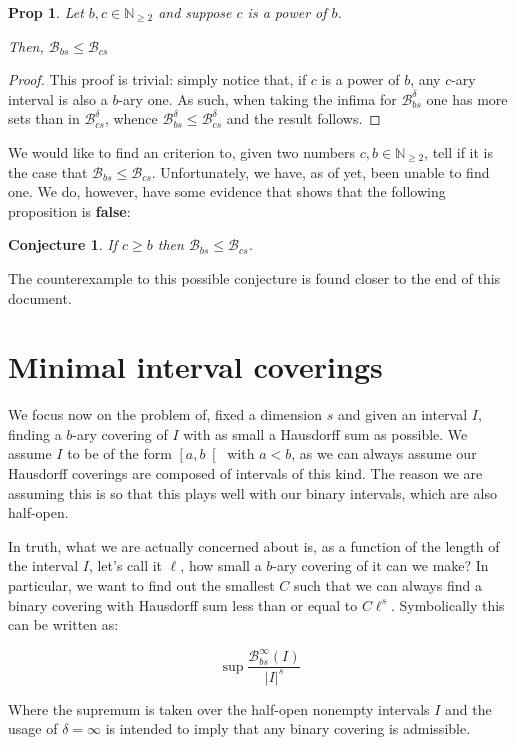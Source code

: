 \documentclass[11pt, reqno]{amsart}
\newcommand{\N}{\mathbb{N}}
\newcommand{\BB}{\mathcal{B}}
\newtheorem{prop}{Prop}
\newtheorem{conjecture}{Conjecture}
\begin{document}
\begin{prop}
Let $b, c \in \N_{\geq 2}$ and suppose $c$ is a power of $b$.

Then, $\BB_{bs} \leq \BB_{cs}$
\end{prop}

\begin{proof}
This proof is trivial: simply notice that, if $c$ is a power of $b$, any $c$-ary interval is also a $b$-ary one. As such, when taking the infima for $\BB_{bs}^\delta$ one has more sets than in $\BB_{cs}^\delta$, whence $\BB_{bs}^\delta \leq \BB_{cs}^\delta$ and the result follows.
\end{proof}

We would like to find an criterion to, given two numbers $c, b \in \N_{\geq 2}$, tell if it is the case that $\BB_{bs} \leq \BB_{cs}$. Unfortunately, we have, as of yet, been unable to find one. We do, however, have some evidence that shows that the following proposition is \textbf{false}: 

\begin{conjecture}
If $c \geq b$ then $\BB_{bs} \leq \BB_{cs}$.
\end{conjecture}

The counterexample to this possible conjecture is found closer to the end of this document.

\section{Minimal interval coverings}\label{sec5}

We focus now on the problem of, fixed a dimension $s$ and given an interval $I$, finding a $b$-ary covering of $I$ with as small a Hausdorff sum as possible. We assume $I$ to be of the form $\left[ a, b \right[$ with $a < b$, as we can always assume our Hausdorff coverings are composed of intervals of this kind. The reason we are assuming this is so that this plays well with our binary intervals, which are also half-open.

In truth, what we are actually concerned about is, as a function of the length of the interval $I$, let's call it $\ell$, how small a $b$-ary covering of it can we make? In particular, we want to find out the smallest $C$ such that we can always find a binary covering with Hausdorff sum less than or equal to $C \ell^s$. Symbolically this can be written as:

\[\sup \frac{\BB_{bs}^\infty(I)}{\lvert I \rvert^s}\]

Where the supremum is taken over the half-open nonempty intervals $I$ and the usage of $\delta = \infty$ is intended to imply that any binary covering is admissible.
\end{document}
